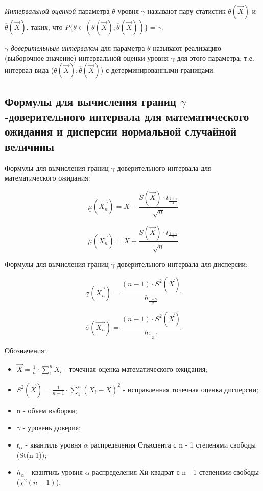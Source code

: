 \documentclass[12pt,a4paper]{scrreprt}
\begin{document}
\textit{Интервальной оценкой} параметра $\theta$ уровня $\gamma$ называют пару статистик $\underline{\theta}(\vec X)$ и $\overline{\theta}(\vec X)$, таких, что $P\{\theta \in (\underline{\theta}(\vec X); \overline{\theta}(\vec X))\} = \gamma.$

$\gamma$-\textit{доверительным интервалом} для параметра $\theta$ называют реализацию (выборочное значение) интервальной оценки уровня $\gamma$ для этого параметра, т.е. интервал вида ($\underline{\theta}(\vec X); \overline{\theta}(\vec X)$) с детерминированными границами.

\subsection*{Формулы для вычисления границ $\gamma$-доверительного интервала для математического ожидания и дисперсии нормальной случайной величины}

Формулы для вычисления границ $\gamma$-доверительного интервала для математического ожидания:

\begin{equation*}
	\underline{\mu}(\vec{X_n}) = \overline{X} - \frac{S(\vec{X})\cdot t_{\frac{1+\gamma}{2}}}{\sqrt{n}} 
\end{equation*}

\begin{equation*}
	\overline{\mu}(\vec{X_n}) = \overline{X} + \frac{S(\vec{X})\cdot t_{\frac{1+\gamma}{2}}}{\sqrt{n}} 
\end{equation*}

Формулы для вычисления границ $\gamma$-доверительного интервала для дисперсии:

\begin{equation*}
	\underline{\sigma}(\vec{X_n}) = \frac{(n - 1) \cdot S^2(\vec{X})}{h_\frac{1+\gamma}{2}}
\end{equation*}

\begin{equation*}
	\overline{\sigma}(\vec{X_n}) = \frac{(n - 1) \cdot S^2(\vec{X})}{h_\frac{1-\gamma}{2}}
\end{equation*}

Обозначения:

\begin{itemize}
	\item $\vec{X} = \frac{1}{n} \cdot \sum_{1}^{n} X_i$ - точечная оценка математического ожидания;
	\item $S^2(\vec{X}) = \frac{1}{n-1}\cdot \sum_{1}^{n} (X_i - \overline{X})^2$ - исправленная точечная оценка дисперсии;
	\item n - объем выборки;
	\item $\gamma$ - уровень доверия;
	\item $t_\alpha$ - квантиль уровня $\alpha$ распределения Стьюдента с n - 1 степенями свободы (St(n-1));
	\item $h_\alpha$ - квантиль уровня $\alpha$ распределения Хи-квадрат с n - 1 степенями свободы ($\chi^2(n-1)$).
\end{itemize}
\end{document}
